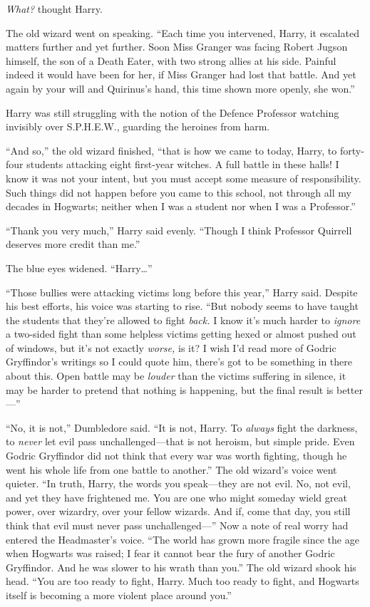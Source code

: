 \emph{What?} thought Harry.

The old wizard went on speaking. ``Each time you intervened, Harry, it
escalated matters further and yet further. Soon Miss Granger was facing
Robert Jugson himself, the son of a Death Eater, with two strong allies
at his side. Painful indeed it would have been for her, if Miss Granger
had lost that battle. And yet again by your will and Quirinus's hand,
this time shown more openly, she won.''

Harry was still struggling with the notion of the Defence Professor
watching invisibly over S.P.H.E.W., guarding the heroines from harm.

``And so,'' the old wizard finished, ``that is how we came to today,
Harry, to forty-four students attacking eight first-year witches. A full
battle in these halls! I know it was not your intent, but you must
accept some measure of responsibility. Such things did not happen before
you came to this school, not through all my decades in Hogwarts; neither
when I was a student nor when I was a Professor.''

``Thank you very much,'' Harry said evenly. ``Though I think Professor
Quirrell deserves more credit than me.''

The blue eyes widened. ``Harry\ldots{}''

``Those bullies were attacking victims long before this year,'' Harry
said. Despite his best efforts, his voice was starting to rise. ``But
nobody seems to have taught the students that they're allowed to fight
\emph{back.} I know it's much harder to \emph{ignore} a two-sided fight
than some helpless victims getting hexed or almost pushed out of
windows, but it's not exactly \emph{worse,} is it? I wish I'd read more
of Godric Gryffindor's writings so I could quote him, there's got to be
something in there about this. Open battle may be \emph{louder} than the
victims suffering in silence, it may be harder to pretend that nothing
is happening, but the final result is better---''

``No, it is not,'' Dumbledore said. ``It is not, Harry. To \emph{always}
fight the darkness, to \emph{never} let evil pass unchallenged---that is
not heroism, but simple pride. Even Godric Gryffindor did not think that
every war was worth fighting, though he went his whole life from one
battle to another.'' The old wizard's voice went quieter. ``In truth,
Harry, the words you speak---they are not evil. No, not evil, and yet
they have frightened me. You are one who might someday wield great
power, over wizardry, over your fellow wizards. And if, come that day,
you still think that evil must never pass unchallenged---'' Now a note
of real worry had entered the Headmaster's voice. ``The world has grown
more fragile since the age when Hogwarts was raised; I fear it cannot
bear the fury of another Godric Gryffindor. And he was slower to his
wrath than you.'' The old wizard shook his head. ``You are too ready to
fight, Harry. Much too ready to fight, and Hogwarts itself is becoming a
more violent place around you.''

